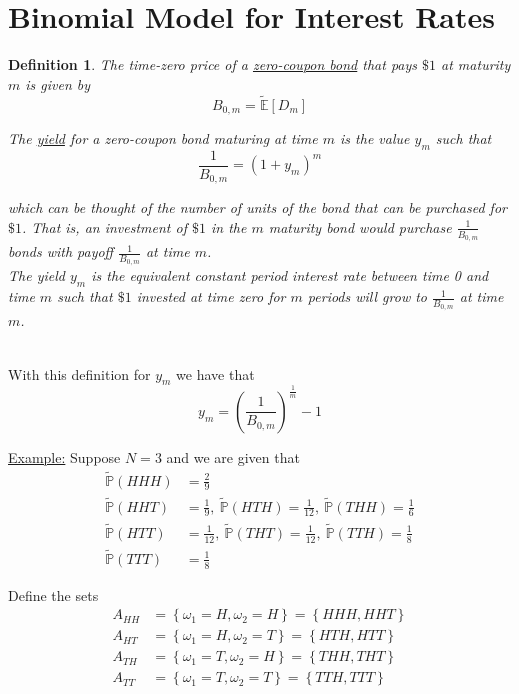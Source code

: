 \documentclass[12pt]{article}
\newtheorem{definition}{Definition}
\newlength\tindent
\renewcommand{\indent}{\hspace*{\tindent}}
\renewcommand{\P}{\mathbb P}
\newcommand{\E}{\mathbb E}
\begin{document}
\section{Binomial Model for Interest Rates}

\begin{definition} The time-zero price of a \underline{zero-coupon bond} that pays $\$1$ at maturity $m$ is given by
\begin{equation*}
	B_{0,m} = \tilde{\E}[D_m]
\end{equation*}

The \underline{yield} for a zero-coupon bond maturing at time $m$ is the value $y_m$ such that
\begin{equation*}
	\frac{1}{B_{0,m}} = (1 + y_m)^m
\end{equation*}

which can be thought of the number of units of the bond that can be purchased for $\$1$. That is, an investment of $\$1$ in the $m$ maturity bond would purchase $\frac{1}{B_{0,m}}$ bonds with payoff $\frac{1}{B_{0,m}}$ at time $m$. \\

\indent The yield $y_m$ is the equivalent constant period interest rate between time 0 and time $m$ such that $\$1$ invested at time zero for $m$ periods will grow to $\frac{1}{B_{0,m}}$ at time $m$.
\end{definition} \hfill\\

With this definition for $y_m$ we have that
\begin{equation*}
	y_m = \left( \frac{1}{B_{0,m}} \right)^\frac{1}{m} - 1
\end{equation*}

\underline{Example:} Suppose $N = 3$ and we are given that
\begin{align*}
	\tilde{\P}(HHH) &= \frac{2}{9} \\
	\tilde{\P}(HHT) &= \frac{1}{9},~\tilde{\P}(HTH) = \frac{1}{12},~\tilde{\P}(THH) = \frac{1}{6} \\
	\tilde{\P}(HTT) &= \frac{1}{12},~\tilde{\P}(THT) = \frac{1}{12},~\tilde{\P}(TTH) = \frac{1}{8} \\			
	\tilde{\P}(TTT) &= \frac{1}{8}	
\end{align*}

Define the sets
\begin{align*}
	A_{HH} &= \left\{\omega_1 = H, \omega_2 = H \right\} = \left\{HHH, HHT \right\} \\
	A_{HT} &= \left\{\omega_1 = H, \omega_2 = T \right\} = \left\{HTH, HTT \right\} \\
	A_{TH} &= \left\{\omega_1 = T, \omega_2 = H \right\} = \left\{THH, THT \right\} \\
	A_{TT} &= \left\{\omega_1 = T, \omega_2 = T \right\} = \left\{TTH, TTT \right\}	
\end{align*}
\end{document}
